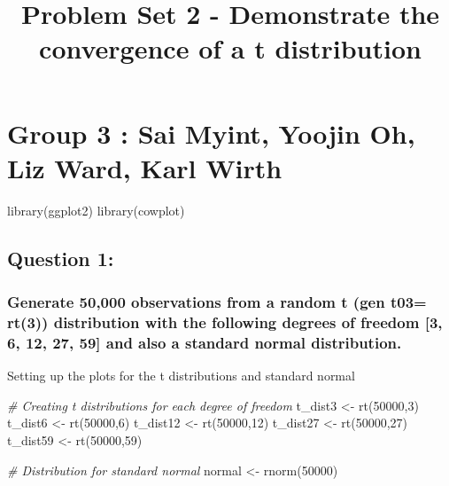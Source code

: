 \documentclass[
]{article}
\title{Problem Set 2 - Demonstrate the convergence of a t distribution}
\author{}
\date{\vspace{-2.5em}}
\newenvironment{Shaded}{\begin{snugshade}}{\end{snugshade}}
\newcommand{\CommentTok}[1]{\textcolor[rgb]{0.56,0.35,0.01}{\textit{#1}}}
\newcommand{\DecValTok}[1]{\textcolor[rgb]{0.00,0.00,0.81}{#1}}
\newcommand{\FunctionTok}[1]{\textcolor[rgb]{0.00,0.00,0.00}{#1}}
\newcommand{\NormalTok}[1]{#1}
\newcommand{\OtherTok}[1]{\textcolor[rgb]{0.56,0.35,0.01}{#1}}
\begin{document}
\maketitle

\hypertarget{group-3-sai-myint-yoojin-oh-liz-ward-karl-wirth}{%
\section{Group 3 : Sai Myint, Yoojin Oh, Liz Ward, Karl
Wirth}\label{group-3-sai-myint-yoojin-oh-liz-ward-karl-wirth}}

\begin{Shaded}
\begin{Highlighting}[]
\FunctionTok{library}\NormalTok{(ggplot2)}
\FunctionTok{library}\NormalTok{(cowplot)}
\end{Highlighting}
\end{Shaded}

\hypertarget{question-1}{%
\subsection{Question 1:}\label{question-1}}

\hypertarget{generate-50000-observations-from-a-random-t-gen-t03-rt3-distribution-with-the-following-degrees-of-freedom-3-6-12-27-59-and-also-a-standard-normal-distribution.}{%
\subsubsection{Generate 50,000 observations from a random t (gen t03=
rt(3)) distribution with the following degrees of freedom {[}3, 6, 12,
27, 59{]} and also a standard normal
distribution.}\label{generate-50000-observations-from-a-random-t-gen-t03-rt3-distribution-with-the-following-degrees-of-freedom-3-6-12-27-59-and-also-a-standard-normal-distribution.}}

\hfill\break
Setting up the plots for the t distributions and standard normal

\begin{Shaded}
\begin{Highlighting}[]
\CommentTok{\# Creating t distributions for each degree of freedom}
\NormalTok{t\_dist3 }\OtherTok{\textless{}{-}} \FunctionTok{rt}\NormalTok{(}\DecValTok{50000}\NormalTok{,}\DecValTok{3}\NormalTok{)}
\NormalTok{t\_dist6 }\OtherTok{\textless{}{-}} \FunctionTok{rt}\NormalTok{(}\DecValTok{50000}\NormalTok{,}\DecValTok{6}\NormalTok{)}
\NormalTok{t\_dist12 }\OtherTok{\textless{}{-}} \FunctionTok{rt}\NormalTok{(}\DecValTok{50000}\NormalTok{,}\DecValTok{12}\NormalTok{)}
\NormalTok{t\_dist27 }\OtherTok{\textless{}{-}} \FunctionTok{rt}\NormalTok{(}\DecValTok{50000}\NormalTok{,}\DecValTok{27}\NormalTok{)}
\NormalTok{t\_dist59 }\OtherTok{\textless{}{-}} \FunctionTok{rt}\NormalTok{(}\DecValTok{50000}\NormalTok{,}\DecValTok{59}\NormalTok{)}

\CommentTok{\# Distribution for standard normal}
\NormalTok{normal }\OtherTok{\textless{}{-}} \FunctionTok{rnorm}\NormalTok{(}\DecValTok{50000}\NormalTok{)}
\end{Highlighting}
\end{Shaded}
\end{document}
